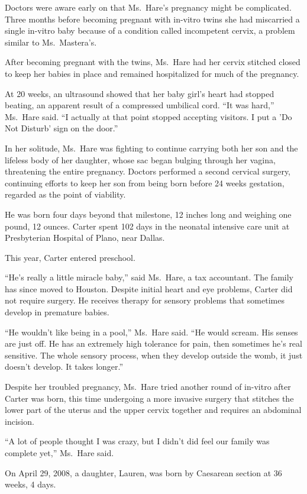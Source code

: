 ﻿\documentclass[12pt]{article}
\begin{document}
Doctors were aware early on that Ms.~Hare's pregnancy might be complicated. Three months before
becoming pregnant with in-vitro twins she had miscarried a single in-vitro baby because of a
condition called incompetent cervix, a problem similar to Ms.~Mastera's.

After becoming pregnant with the twins, Ms.~Hare had her cervix stitched closed to keep her babies
in place and remained hospitalized for much of the pregnancy.

At 20 weeks, an ultrasound showed that her baby girl's heart had stopped beating, an apparent result
of a compressed umbilical cord. ``It was hard,'' Ms.~Hare said. ``I actually at that point stopped
accepting visitors. I put a 'Do Not Disturb' sign on the door.''

In her solitude, Ms.~Hare was fighting to continue carrying both her son and the lifeless body of
her daughter, whose sac began bulging through her vagina, threatening the entire pregnancy. Doctors
performed a second cervical surgery, continuing efforts to keep her son from being born before 24
weeks gestation, regarded as the point of viability.

He was born four days beyond that milestone, 12 inches long and weighing one pound, 12 ounces.
Carter spent 102 days in the neonatal intensive care unit at Presbyterian Hospital of Plano, near
Dallas.

This year, Carter entered preschool.

``He's really a little miracle baby,'' said Ms.~Hare, a tax accountant. The family has since moved
to Houston. Despite initial heart and eye problems, Carter did not require surgery. He receives
therapy for sensory problems that sometimes develop in premature babies.

``He wouldn't like being in a pool,'' Ms.~Hare said. ``He would scream. His senses are just off. He
has an extremely high tolerance for pain, then sometimes he's real sensitive. The whole sensory
process, when they develop outside the womb, it just doesn't develop. It takes longer.''

Despite her troubled pregnancy, Ms.~Hare tried another round of in-vitro after Carter was born, this
time undergoing a more invasive surgery that stitches the lower part of the uterus and the upper
cervix together and requires an abdominal incision.

``A lot of people thought I was crazy, but I didn't did feel our family was complete yet,'' Ms.~Hare
said.

On April 29, 2008, a daughter, Lauren, was born by Caesarean section at 36 weeks, 4 days.
\end{document}
